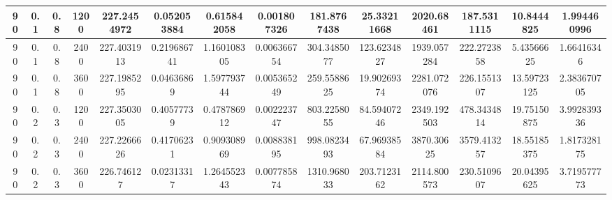 \documentclass[main.tex]{subfiles}
\begin{document}
\begin{table}[ht]
\begin{tabular}{cccccccccccccc}
		\multicolumn{1}{|c|}{90} & \multicolumn{1}{c|}{0.1} & \multicolumn{1}{c|}{0.8} & \multicolumn{1}{c|}{1200} & \multicolumn{1}{c|}{227.2454972} & \multicolumn{1}{c|}{0.052053884} & \multicolumn{1}{c|}{0.615842058} & \multicolumn{1}{c|}{0.001807326} & \multicolumn{1}{c|}{181.8767438} & \multicolumn{1}{c|}{25.33211668} & \multicolumn{1}{c|}{2020.68461}  & \multicolumn{1}{c|}{187.5311115} & \multicolumn{1}{c|}{10.8444825}  & \multicolumn{1}{c|}{1.994460996} \\ \hline
		\multicolumn{1}{|c|}{90} & \multicolumn{1}{c|}{0.1} & \multicolumn{1}{c|}{0.8} & \multicolumn{1}{c|}{2400} & \multicolumn{1}{c|}{227.4031913} & \multicolumn{1}{c|}{0.219686741} & \multicolumn{1}{c|}{1.160108305} & \multicolumn{1}{c|}{0.006366754} & \multicolumn{1}{c|}{304.3485077} & \multicolumn{1}{c|}{123.6234827} & \multicolumn{1}{c|}{1939.057284} & \multicolumn{1}{c|}{222.2723858} & \multicolumn{1}{c|}{5.43566625}  & \multicolumn{1}{c|}{1.66416346}  \\ \hline
		\multicolumn{1}{|c|}{90} & \multicolumn{1}{c|}{0.1} & \multicolumn{1}{c|}{0.8} & \multicolumn{1}{c|}{3600} & \multicolumn{1}{c|}{227.1985295} & \multicolumn{1}{c|}{0.04636869}  & \multicolumn{1}{c|}{1.597793744} & \multicolumn{1}{c|}{0.005365249} & \multicolumn{1}{c|}{259.5588625} & \multicolumn{1}{c|}{19.90269374} & \multicolumn{1}{c|}{2281.072076} & \multicolumn{1}{c|}{226.1551307} & \multicolumn{1}{c|}{13.59723125} & \multicolumn{1}{c|}{2.383670705} \\ \hline
		\multicolumn{1}{|c|}{90} & \multicolumn{1}{c|}{0.2} & \multicolumn{1}{c|}{0.3} & \multicolumn{1}{c|}{1200} & \multicolumn{1}{c|}{227.3503005} & \multicolumn{1}{c|}{0.40577739}  & \multicolumn{1}{c|}{0.478786912} & \multicolumn{1}{c|}{0.002223747} & \multicolumn{1}{c|}{803.2258055} & \multicolumn{1}{c|}{84.59407246} & \multicolumn{1}{c|}{2349.192503} & \multicolumn{1}{c|}{478.3434814} & \multicolumn{1}{c|}{19.75150875} & \multicolumn{1}{c|}{3.992839336} \\ \hline
		\multicolumn{1}{|c|}{90} & \multicolumn{1}{c|}{0.2} & \multicolumn{1}{c|}{0.3} & \multicolumn{1}{c|}{2400} & \multicolumn{1}{c|}{227.2266626} & \multicolumn{1}{c|}{0.41706231}  & \multicolumn{1}{c|}{0.909308969} & \multicolumn{1}{c|}{0.008838195} & \multicolumn{1}{c|}{998.0823493} & \multicolumn{1}{c|}{67.96938584} & \multicolumn{1}{c|}{3870.30625}  & \multicolumn{1}{c|}{3579.413257} & \multicolumn{1}{c|}{18.55185375} & \multicolumn{1}{c|}{1.817328175} \\ \hline
		\multicolumn{1}{|c|}{90} & \multicolumn{1}{c|}{0.2} & \multicolumn{1}{c|}{0.3} & \multicolumn{1}{c|}{3600} & \multicolumn{1}{c|}{226.746127}  & \multicolumn{1}{c|}{0.02313317}  & \multicolumn{1}{c|}{1.264552343} & \multicolumn{1}{c|}{0.007785874} & \multicolumn{1}{c|}{1310.968033} & \multicolumn{1}{c|}{203.7123162} & \multicolumn{1}{c|}{2114.800573} & \multicolumn{1}{c|}{230.5109607} & \multicolumn{1}{c|}{20.04395625} & \multicolumn{1}{c|}{3.719577773} \\ \hline

\end{tabular}
\end{table}
\end{document}
